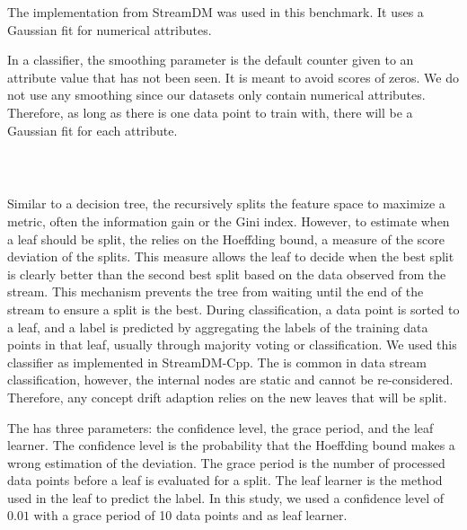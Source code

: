 The implementation from StreamDM was used in this
benchmark. It uses a Gaussian
fit for numerical attributes.

In a \naivebayes classifier, the smoothing parameter is the
default counter given to an attribute value that
has not been seen. It is meant to avoid scores of zeros.
We do not use any smoothing since our datasets
only contain numerical
attributes. Therefore, as long as there is one data
point to train with, there will be a Gaussian
fit for each attribute.

\subsubsection{\hoeffdingtree~\cite{VFDT}}
Similar to a decision tree, the \hoeffdingtree
recursively splits the feature space to maximize a metric, often the
information gain or the Gini
index. However,  to estimate when a leaf should be
split, the \hoeffdingtree relies on the
Hoeffding bound, a measure of the score deviation
of the splits. This measure allows the leaf to
decide when the best split is clearly better than
the second best split based on the data observed
from the stream. This mechanism prevents the tree
from waiting until the end of the stream
to ensure a split is the best.
During classification, a data point
is sorted to a leaf, and a label is predicted by
aggregating the labels of the training data points
in that leaf, usually through majority voting or
\naivebayes classification.  We used this
classifier as implemented in StreamDM-Cpp.  The
\hoeffdingtree is common in data stream
classification, however, the internal nodes are
static and cannot be re-considered. Therefore, any
concept drift adaption relies on the new leaves
that will be split.

The \hoeffdingtree has three parameters: the
confidence level, the grace period, and the leaf
learner. The confidence level is the probability that
the Hoeffding bound makes a wrong estimation of
the deviation. The grace period is the number of
processed data points before a leaf is evaluated for a split.
 The leaf learner is the method used in the
leaf to predict the label.  In this study, we used
a confidence level of $0.01$ with a grace period
of 10 data points and \naivebayes as leaf
learner.

